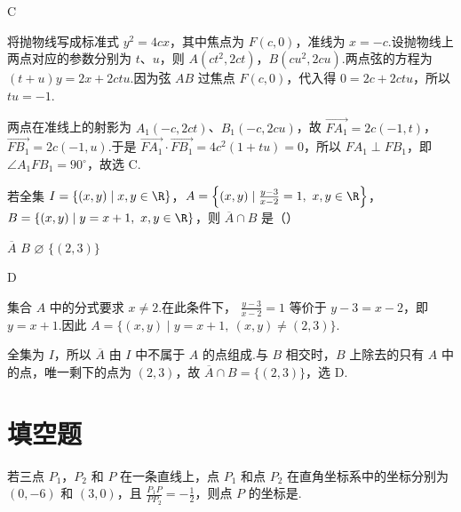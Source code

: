 \begin{answer}
C
\end{answer}

\begin{solution}
将抛物线写成标准式 \(y^2=4cx\)，其中焦点为 \(F(c,0)\)，准线为 \(x=-c\).设抛物线上两点对应的参数分别为 \(t\)、\(u\)，则
\(A(ct^2,2ct)\)，\(B(cu^2,2cu)\).两点弦的方程为
\((t+u)y=2x+2ctu\).因为弦 \(AB\) 过焦点 \(F(c,0)\)，代入得
\(0=2c+2ctu\)，所以 \(tu=-1\).

两点在准线上的射影为 \(A_1(-c,2ct)\)、\(B_1(-c,2cu)\)，故
\(\overrightarrow{FA_1}=2c(-1,t)\)，\(\overrightarrow{FB_1}=2c(-1,u)\).于是
\(\overrightarrow{FA_1}\cdot\overrightarrow{FB_1}=4c^2(1+tu)=0\)，所以 \(FA_1\perp FB_1\)，即 \(\angle A_1FB_1=90^\circ\)，故选 C.
\end{solution}

\begin{problem}

若全集 \(I=\{(x,y)\mid x,y\in\R\}\)，\(A=\left\{(x,y)\mid \frac{y-3}{x-2}=1,\ x,y\in\R \right\}\)，\(B=\{(x,y)\mid y=x+1,\ x,y\in\R\}\)，则 \(\overline{A}\cap B\) 是（\quad）

\choices
    {\(\overline{A}\)}
    {\(B\)}
    {\(\varnothing\)}
    {\(\{(2,3)\}\)}
\end{problem}

\begin{answer}
D
\end{answer}

\begin{solution}
集合 \(A\) 中的分式要求 \(x\ne2\).在此条件下，
\(\frac{y-3}{x-2}=1\) 等价于 \(y-3=x-2\)，即 \(y=x+1\).因此
\(A=\{(x,y)\mid y=x+1,\ (x,y)\ne(2,3)\}\).

全集为 \(I\)，所以 \(\overline A\) 由 \(I\) 中不属于 \(A\) 的点组成.与 \(B\) 相交时，\(B\) 上除去的只有 \(A\) 中的点，唯一剩下的点为 \((2,3)\)，故
\(\overline A\cap B=\{(2,3)\}\)，选 D.
\end{solution}

\section{填空题}

\begin{problem}

若三点 \(P_1\)，\(P_2\) 和 \(P\) 在一条直线上，点 \(P_1\) 和点 \(P_2\) 在直角坐标系中的坐标分别为 \((0,-6)\) 和 \((3,0)\)，且 \(\frac{P_1P}{PP_2}=-\frac{1}{2}\)，则点 \(P\) 的坐标是\fillinblank{}.
\end{problem}

